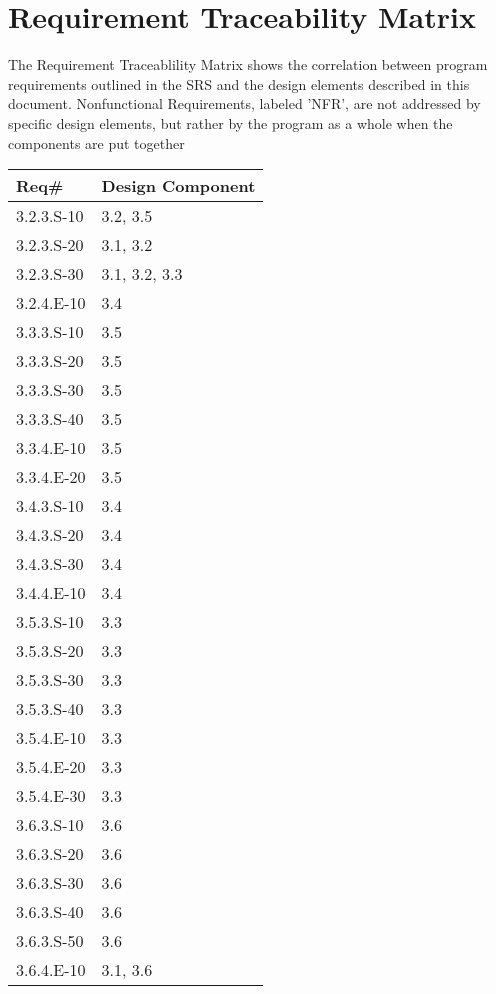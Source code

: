 \section{Requirement Traceability Matrix}
The Requirement Traceablility Matrix shows the correlation between program requirements outlined in the SRS and the design elements described in this document.
Nonfunctional Requirements, labeled 'NFR', are not addressed by specific design elements, but rather by the program as a whole when the components are put together
\begin{center}
\begin{tabular}{| l || l | }
\hline			
Req\# & Design Component \\ \hline \hline
3.2.3.S-10 & 3.2, 3.5  \\ \hline
3.2.3.S-20 & 3.1, 3.2   \\ \hline
3.2.3.S-30 & 3.1, 3.2, 3.3   \\ \hline
3.2.4.E-10 & 3.4  \\ \hline
3.3.3.S-10 & 3.5  \\ \hline
3.3.3.S-20 & 3.5  \\ \hline
3.3.3.S-30 & 3.5  \\ \hline
3.3.3.S-40 & 3.5  \\ \hline
3.3.4.E-10 & 3.5  \\ \hline
3.3.4.E-20 & 3.5  \\ \hline
3.4.3.S-10 & 3.4  \\ \hline
3.4.3.S-20 & 3.4  \\ \hline
3.4.3.S-30 & 3.4  \\ \hline
3.4.4.E-10 & 3.4  \\ \hline
3.5.3.S-10 & 3.3  \\ \hline
3.5.3.S-20 & 3.3  \\ \hline
3.5.3.S-30 & 3.3  \\ \hline
3.5.3.S-40 & 3.3  \\ \hline
3.5.4.E-10 & 3.3  \\ \hline
3.5.4.E-20 & 3.3  \\ \hline
3.5.4.E-30 & 3.3  \\ \hline
3.6.3.S-10 & 3.6  \\ \hline
3.6.3.S-20 & 3.6  \\ \hline
3.6.3.S-30 & 3.6  \\ \hline
3.6.3.S-40 & 3.6  \\ \hline
3.6.3.S-50 & 3.6  \\ \hline
3.6.4.E-10 & 3.1, 3.6  \\ \hline

\end{tabular}
\end{center}
